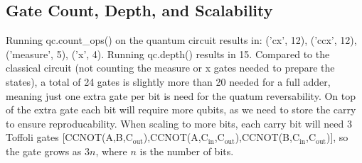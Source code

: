 \documentclass{exam}
\begin{document}
    \subsection{Gate Count, Depth, and Scalability}
        Running qc.count\_ops() on the quantum circuit results in: ('cx', 12), ('ccx', 12), ('measure', 5), ('x', 4).
        Running qc.depth() results in 15.
        Compared to the classical circuit (not counting the measure or x gates needed to prepare the states), a total of 24 gates is slightly more than 20 needed for a full adder, meaning just one extra gate per bit is need for the quatum reversability.
        On top of the extra gate each bit will require more qubits, as we need to store the carry to ensure reproducability.
        When scaling to more bits, each carry bit will need 3 Toffoli gates [CCNOT(A,B,C$_{\text{out}}$),CCNOT(A,C$_{\text{in}}$,C$_{\text{out}}$),CCNOT(B,C$_{\text{in}}$,C$_{\text{out}}$)], so the gate grows as $3n$, where $n$ is the number of bits.
\end{document}
